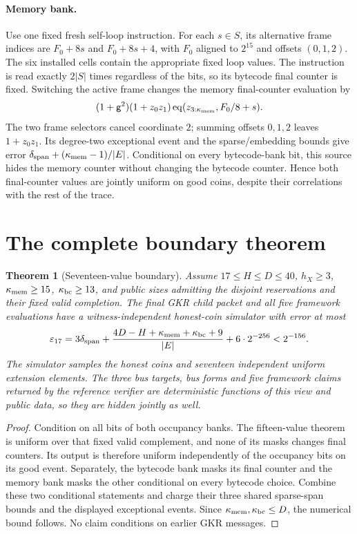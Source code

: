 \documentclass[11pt]{article}
\newtheorem{theorem}{Theorem}
\begin{document}
\paragraph{Memory bank.} Use one fixed fresh self-loop instruction. For each $s\in S$, its alternative frame indices are $F_0+8s$ and $F_0+8s+4$, with $F_0$ aligned to $2^{15}$ and offsets $(0,1,2)$. The six installed cells contain the appropriate fixed loop values. The instruction is read exactly $2|S|$ times regardless of the bits, so its bytecode final counter is fixed. Switching the active frame changes the memory final-counter evaluation by
\[
 (1+\mathsf{g}^2)(1+z_0z_1)\operatorname{eq}(z_{3:\kappa_{\mathrm{mem}}},F_0/8+s).
\]
The two frame selectors cancel coordinate $2$; summing offsets $0,1,2$ leaves $1+z_0z_1$. Its degree-two exceptional event and the sparse/embedding bounds give error $\delta_{\mathrm{span}}+(\kappa_{\mathrm{mem}}-1)/|E|$. Conditional on every bytecode-bank bit, this source hides the memory counter without changing the bytecode counter. Hence both final-counter values are jointly uniform on good coins, despite their correlations with the rest of the trace.

\section{The complete boundary theorem}

\begin{theorem}[Seventeen-value boundary]
Assume $17\le H\le D\le40$, $h_X\ge3$, $\kappa_{\mathrm{mem}}\ge15$, $\kappa_{\mathrm{bc}}\ge13$, and public sizes admitting the disjoint reservations and their fixed valid completion. The final GKR child packet and all five framework evaluations have a witness-independent honest-coin simulator with error at most
\[
 \varepsilon_{17}=3\delta_{\mathrm{span}}+
 \frac{4D-H+\kappa_{\mathrm{mem}}+\kappa_{\mathrm{bc}}+9}{|E|}+6\cdot2^{-256}<2^{-156}.
\]
The simulator samples the honest coins and seventeen independent uniform extension elements. The three bus targets, bus forms and five framework claims returned by the reference verifier are deterministic functions of this view and public data, so they are hidden jointly as well.
\end{theorem}
\begin{proof}
Condition on all bits of both occupancy banks. The fifteen-value theorem is uniform over that fixed valid complement, and none of its masks changes final counters. Its output is therefore uniform independently of the occupancy bits on its good event. Separately, the bytecode bank masks its final counter and the memory bank masks the other conditional on every bytecode choice. Combine these two conditional statements and charge their three shared sparse-span bounds and the displayed exceptional events. Since $\kappa_{\mathrm{mem}},\kappa_{\mathrm{bc}}\le D$, the numerical bound follows. No claim conditions on earlier GKR messages.
\end{proof}
\end{document}
